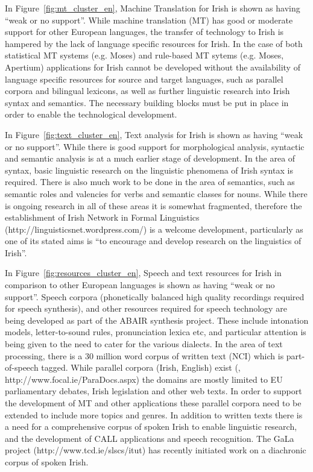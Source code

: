 \begin{multicols}{2}
In Figure~\ref{fig:mt_cluster_en}, Machine Translation for Irish is shown as having ``weak or no support''. While machine translation (MT) has good or moderate support for other European languages, the transfer of technology to Irish is hampered by the lack of language specific resources for Irish. In the case of both statistical MT systems (e.g. Moses) and rule-based MT sytems (e.g. Moses, Apertium) applications for Irish cannot be developed  without the availability of language specific resources for source and target languages, such as parallel corpora and bilingual lexicons,  as well as further linguistic research into Irish syntax and semantics. The necessary building blocks must be put in place in order to enable the technological development.

In Figure~\ref{fig:text_cluster_en}, Text analysis for Irish is shown as having ``weak or no support''. While there is good support for morphological analysis, syntactic and semantic analysis is at a much earlier stage of development. In the area of syntax, basic linguistic research on the linguistic phenomena of Irish syntax is required. There is also much work to be done in the area of semantics, such as semantic roles and valencies for verbs and semantic classes for nouns. While there is ongoing research in all of these areas it is somewhat fragmented, therefore the establishment of  Irish Network in Formal Linguistics (http://linguisticsnet.wordpress.com/) is a welcome development, particularly as one of its stated aims is ``to encourage and develop research on the linguistics of Irish''.


In Figure~\ref{fig:resources_cluster_en}, Speech and text resources for Irish in comparison to other European languages is shown as having ``weak or no support''. Speech corpora (phonetically balanced high quality recordings required for speech synthesis), and other resources required for speech technology are being developed as part of the ABAIR synthesis  project. These include intonation models, letter-to-sound rules, pronunciation lexica etc, and particular attention is being given to the need to cater for the various dialects.  In the area of text processing, there is a 30 million word corpus of written text (NCI) which is part-of-speech tagged. While  parallel corpora (Irish, English) exist (\cite{scannell}, http://www.focal.ie/ParaDocs.aspx) the domains are mostly limited to EU parliamentary debates, Irish legislation and other web texts. In order to support the development of MT and other applications these parallel corpora need to be extended to include more topics and genres. In addition to written texts there is a need for a comprehensive corpus of spoken Irish to enable linguistic research, and the development of CALL applications and speech recognition. The GaLa project (http://www.tcd.ie/slscs/itut) has recently initiated work on a diachronic corpus of spoken Irish.


\end{multicols}
